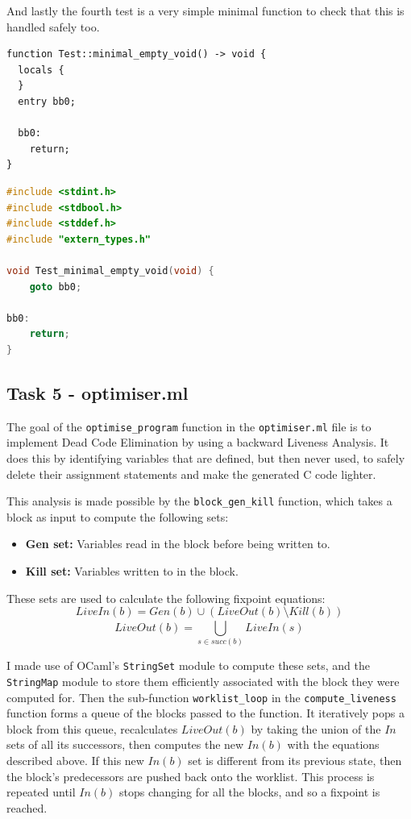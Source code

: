 \documentclass[11pt, a4paper]{article}
\begin{document}
\bigskip

And lastly the fourth test is a very simple minimal function to check that this is handled safely too.

\begin{lstlisting}[caption=test4.resir]
function Test::minimal_empty_void() -> void {
  locals {
  }
  entry bb0;

  bb0:
    return;
}
\end{lstlisting}

\bigskip

\begin{lstlisting}[caption=test4.expected.c, language=C, morekeywords={bool, int32_t, int64_t}]
#include <stdint.h>
#include <stdbool.h>
#include <stddef.h>
#include "extern_types.h"

void Test_minimal_empty_void(void) {
    goto bb0;

bb0:
    return;
}
\end{lstlisting}

\subsection{Task 5 - optimiser.ml}

The goal of the \texttt{optimise\_program} function in the \texttt{optimiser.ml} file is to implement Dead Code Elimination by using a backward Liveness Analysis. It does this
by identifying variables that are defined, but then never used, to safely delete their assignment statements and make the generated C code lighter. 

\medskip
This analysis is made possible by the \texttt{block\_gen\_kill} function, which takes a block as input to compute the following sets:

\begin{itemize}[nosep]
    \item \textbf{Gen set:} Variables read in the block before being written to.
    \item \textbf{Kill set:} Variables written to in the block.
\end{itemize}

These sets are used to calculate the following fixpoint equations:
$$LiveIn(b) = Gen(b) \cup (LiveOut(b) \setminus Kill(b))$$
$$LiveOut(b) = \bigcup_{s \in succ(b)}^{} LiveIn(s)$$

I made use of OCaml's \texttt{StringSet} module to compute these sets, and the \texttt{StringMap} module to store them efficiently associated with
the block they were computed for. Then the sub-function \texttt{worklist\_loop} in the \texttt{compute\_liveness} function forms a queue of the blocks
passed to the function. It iteratively pops a block from this queue, recalculates $LiveOut(b)$ by taking the union of the $In$ sets of all its
successors, then computes the new $In(b)$ with the equations described above. If this new $In(b)$ set is different from its previous state,
then the block's predecessors are pushed back onto the worklist. This process is repeated until $In(b)$ stops changing for all the blocks, and so a 
fixpoint is reached.
\end{document}
